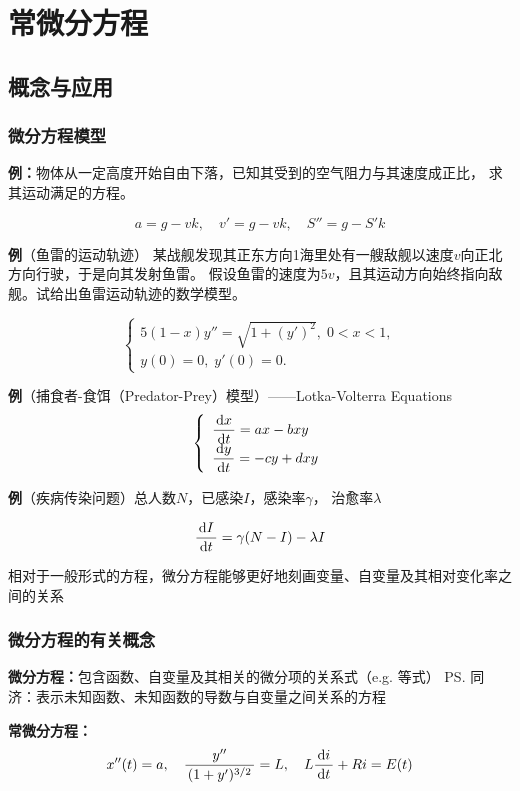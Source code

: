 \setcounter{chapter}{6}

\chapter{常微分方程}

\section{概念与应用}

\subsection{微分方程模型}

{\bf 例：}物体从一定高度开始自由下落，已知其受到的空气阻力与其速度成正比，
求其运动满足的方程。

$$a=g-vk,\quad v'=g-vk,\quad S''=g-S'k$$

{\bf 例}（鱼雷的运动轨迹）
某战舰发现其正东方向1海里处有一艘敌舰以速度$v$向正北方向行驶，于是向其发射鱼雷。
假设鱼雷的速度为$5v$，且其运动方向始终指向敌舰。试给出鱼雷运动轨迹的数学模型。

$$
	\left\{\begin{array}{l}
		5(1-x)y''=\sqrt{1+(y')^2},\;0<x<1,\\
		y(0)=0,\;y'(0)=0.
	\end{array}\right.
$$

{\bf 例}（捕食者-食饵（Predator-Prey）模型）——Lotka-Volterra Equations
$$
	\left\{\begin{array}{l}
		\displaystyle\frac{\,{\mathrm{d} x}\,}{\,{\mathrm{d} t}\,}=ax-bxy\\
		\displaystyle\frac{\,{\mathrm{d} y}\,}{\,{\mathrm{d} t}\,}=-cy+dxy
	\end{array}\right.
$$

{\bf 例}（疾病传染问题）总人数$N$，已感染$I$，感染率$\gamma$，
治愈率$\lambda$

$$\displaystyle\frac{\,{\mathrm{d} I}\,}{\,{\mathrm{d} t}\,}=\gamma (N-I)-\lambda I$$

相对于一般形式的方程，微分方程能够更好地刻画变量、自变量及其相对变化率之间的关系

\subsection{微分方程的有关概念}

{\bf 微分方程：}包含函数、自变量及其相关的微分项的关系式（e.g. 等式）
\ps{同济：表示未知函数、未知函数的导数与自变量之间关系的方程}

{\bf 常微分方程：} 
  $$x''(t)=a,\quad  \displaystyle\frac{\,{y''}\,}{\,{(1+y')^{3/2}}\,}=L,\quad 
  L\displaystyle\frac{\,{\mathrm{d} i}\,}{\,{\mathrm{d} t}\,}+Ri=E(t)$$ 
  
